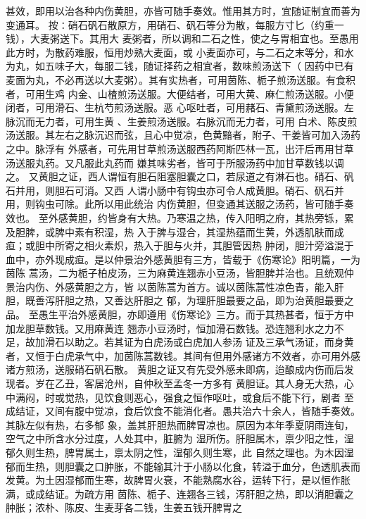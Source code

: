 \documentclass[a4paper,12pt,UTF8,twoside]{ctexbook}
\begin{document}
甚效，即用以治各种内伤黄胆，亦皆可随手奏效。惟用其方时，宜随证制宜而善为变通耳。 
按∶硝石矾石散原方，用硝石、矾石等分为散，每服方寸匕（约重一钱），大麦粥送下。其用大 
麦粥者，所以调和二石之性，使之与胃相宜也。至愚用此方时，为散药难服，恒用炒熟大麦面，或 
小麦面亦可，与二石之末等分，和水为丸，如五味子大，每服二钱，随证择药之相宜者，数味煎汤送下（ 
因药中已有麦面为丸，不必再送以大麦粥）。其有实热者，可用茵陈、栀子煎汤送服。有食积者，可用生鸡 
内金、山楂煎汤送服。大便结者，可用大黄、麻仁煎汤送服。小便闭者，可用滑石、生杭芍煎汤送服。恶 
心呕吐者，可用赭石、青黛煎汤送服。左脉沉而无力者，可用生黄 、生姜煎汤送服。右脉沉而无力者，可用 
白术、陈皮煎汤送服。其左右之脉沉迟而弦，且心中觉凉，色黄黯者，附子、干姜皆可加入汤药之中。脉浮有 
外感者，可先用甘草煎汤送服西药阿斯匹林一瓦，出汗后再用甘草汤送服丸药。又凡服此丸药而 
嫌其味劣者，皆可于所服汤药中加甘草数钱以调之。 
又黄胆之证，西人谓恒有胆石阻塞胆囊之口，若尿道之有淋石也。硝石、矾石并用，则胆石可消。又西 
人谓小肠中有钩虫亦可令人成黄胆。硝石、矾石并用，则钩虫可除。此所以用此统治 
内伤黄胆，但变通其送服之汤药，皆可随手奏效也。 
至外感黄胆，约皆身有大热。乃寒温之热，传入阳明之府，其热旁铄，累及胆脾，或脾中素有积湿，热 
入于脾与湿合，其湿热蕴而生黄，外透肌肤而成疸；或胆中所寄之相火素炽，热入于胆与火并，其胆管因热 
肿闭，胆汁旁溢混于血中，亦外现成疸。是以仲景治外感黄胆有三方，皆载于《伤寒论》阳明篇，一为茵陈 
蒿汤，二为栀子柏皮汤，三为麻黄连翘赤小豆汤，皆胆脾并治也。且统观仲景治内伤、外感黄胆之方，皆 
以茵陈蒿为首方。诚以茵陈蒿性凉色青，能入肝胆，既善泻肝胆之热，又善达肝胆之 
郁，为理肝胆最要之品，即为治黄胆最要之品。 
至愚生平治外感黄胆，亦即遵用《伤寒论》三方。而于其热甚者，恒于方中加龙胆草数钱。又用麻黄连 
翘赤小豆汤时，恒加滑石数钱。恐连翘利水之力不足，故加滑石以助之。若其证为白虎汤或白虎加人参汤 
证及三承气汤证，而身黄者，又恒于白虎承气中，加茵陈蒿数钱。其间有但用外感诸方不效者，亦可用外感 
诸方煎汤，送服硝石矾石散。 
黄胆之证又有先受外感未即病，迨酿成内伤而后发现者。岁在乙丑，客居沧州，自仲秋至孟冬一方多有 
黄胆证。其人身无大热，心中满闷，时或觉热，见饮食则恶心，强食之恒作呕吐，或食后不能下行，剧者 
至成结证，又间有腹中觉凉，食后饮食不能消化者。愚共治六十余人，皆随手奏效。其脉左似有热，右多郁 
象，盖其肝胆热而脾胃凉也。原因为本年季夏阴雨连旬，空气之中所含水分过度，人处其中，脏腑为 
湿所伤。肝胆属木，禀少阳之性，湿郁久则生热，脾胃属土，禀太阴之性，湿郁久则生寒，此 
自然之理也。为木因湿郁而生热，则胆囊之口肿胀，不能输其汁于小肠以化食，转溢于血分，色透肌表而 
发黄。为土因湿郁而生寒，故脾胃火衰，不能熟腐水谷，运转下行，是以恒作胀满，或成结证。为疏方用 
茵陈、栀子、连翘各三钱，泻肝胆之热，即以消胆囊之肿胀；浓朴、陈皮、生麦芽各二钱，生姜五钱开脾胃之 
\end{document}
